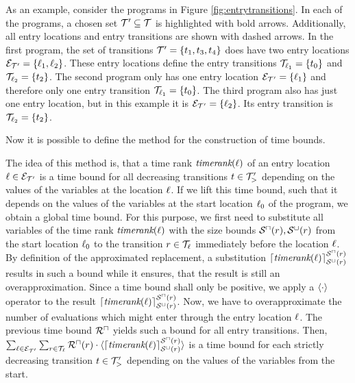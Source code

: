 

As an example, consider the programs in Figure \ref{fig:entrytransitions}.
In each of the programs, a chosen set $\mathcal{T}' \subseteq \mathcal{T}$ is highlighted with bold arrows.
Additionally, all entry locations and entry transitions are shown with dashed arrows.
In the first program, the set of transitions $\mathcal{T}' = \lbrace t_1, t_3, t_4 \rbrace$ does have two entry locations $\mathcal{E}_{\mathcal{T}'} = \lbrace \ell_1, \ell_2 \rbrace$.
These entry locations define the entry transitions $\mathcal{T}_{\ell_1} = \lbrace t_0 \rbrace$ and $\mathcal{T}_{\ell_2} = \lbrace t_2 \rbrace$.
The second program only has one entry location $\mathcal{E}_{\mathcal{T}'} = \lbrace \ell_1 \rbrace$ and therefore only one entry transition $\mathcal{T}_{\ell_1} = \lbrace t_0 \rbrace$.
The third program also has just one entry location, but in this example it is $\mathcal{E}_{\mathcal{T}'} = \lbrace \ell_2 \rbrace$.
Its entry transition is $\mathcal{T}_{\ell_2} = \lbrace t_2 \rbrace$.

Now it is possible to define the method for the construction of time bounds.



The idea of this method is, that a time rank $\emph{timerank}(\ell)$ of an entry location $\ell \in \mathcal{E}_{\mathcal{T}'}$ is a time bound for all decreasing transitions $t \in \mathcal{T}'_>$ depending on the values of the variables at the location $\ell$.
If we lift this time bound, such that it depends on the values of the variables at the start location $\ell_0$ of the program, we obtain a global time bound.
For this purpose, we first need to substitute all variables of the time rank $\emph{timerank}(\ell)$ with the size bounds ${\mathcal{S}^\sqcap}(r), {\mathcal{S}^\sqcup}(r)$ from the start location $\ell_0$ to the transition $r \in \mathcal{T}_{\ell}$ immediately before the location $\ell$.
By definition of the approximated replacement, a substitution $\lceil \emph{timerank}(\ell) \rceil^{{\mathcal{S}^\sqcap}(r)}_{{\mathcal{S}^\sqcup}(r)}$ results in such a bound while it ensures, that the result is still an overapproximation. 
Since a time bound shall only be positive, we apply a $\langle\cdot\rangle$ operator to the result $\lceil \emph{timerank}(\ell) \rceil^{{\mathcal{S}^\sqcap}(r)}_{{\mathcal{S}^\sqcup}(r)}$.
Now, we have to overapproximate the number of evaluations which might enter through the entry location $\ell$.
The previous time bound ${\mathcal{R}^\sqcap}$ yields such a bound for all entry transitions.
Then, $\sum_{\ell \in \mathcal{E}_{\mathcal{T}'}} \sum_{r \in \mathcal{T}_\ell} {\mathcal{R}^\sqcap}(r) \cdot \langle\lceil \emph{timerank}(\ell) \rceil^{{\mathcal{S}^\sqcap}(r)}_{{\mathcal{S}^\sqcup}(r)}\rangle$ is a time bound for each strictly decreasing transition $t \in \mathcal{T}'_>$ depending on the values of the variables from the start.

